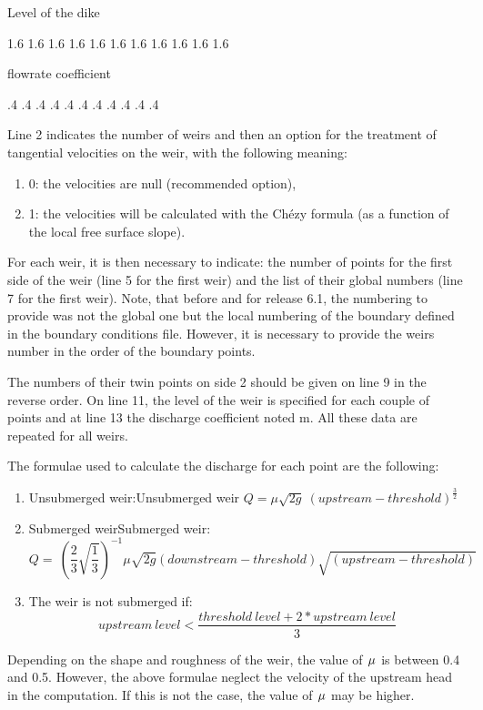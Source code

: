  Level of the dike

 1.6 1.6 1.6 1.6 1.6 1.6 1.6 1.6 1.6 1.6 1.6

 flowrate coefficient

  .4  .4  .4  .4  .4  .4  .4  .4  .4  .4  .4



 Line 2 indicates the number of weirs and then an option for the treatment of tangential velocities on the weir, with the following meaning:

\begin{enumerate}
\item  0: the velocities are null (recommended option),

\item  1: the velocities will be calculated with the Ch\'{e}zy formula (as a function of the local free surface slope).
\end{enumerate}

 For each weir, it is then necessary to indicate: the number of points for the first side of the weir (line 5 for the first weir) and the list of their global numbers (line 7 for the first weir). Note, that before and for release 6.1, the numbering to provide was not the global one but the local numbering of the boundary defined in the boundary conditions file. However, it is necessary to provide the weirs number in the order of the boundary points.

 The numbers of their twin points on side 2 should be given on line 9 in the reverse order. On line 11, the level of the weir is specified for each couple of points and at line 13 the discharge coefficient noted m. All these data are repeated for all weirs.

 The formulae used to calculate the discharge for each point are the following:

\begin{enumerate}
\item  Unsubmerged weir:Unsubmerged weir   $Q=\mu \sqrt{2g}\ {\left(upstream-threshold\right)}^{\frac{3}{2}}$

\item  Submerged weirSubmerged weir:
\[Q=\ {\left(\frac{2}{3}\sqrt{\frac{1}{3}}\right)}^{-1}\mu \sqrt{2g}\left(downstream-threshold\right)\sqrt{\left(upstream-threshold\right)}\]

\item  The weir is not submerged if:
\[upstream\ level<\frac{threshold\ level+2*upstream\ level}{3}\]
\end{enumerate}
Depending on the shape and roughness of the weir, the value of ${\kern 1pt} \mu $ is between 0.4 and 0.5. However, the above formulae neglect the velocity of the upstream head in the computation. If this is not the case, the value of ${\kern 1pt} \mu $ may be higher.

